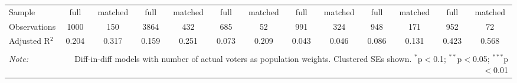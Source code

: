 \begin{table}[!htbp]
\begin{tabular}{@{\extracolsep{5pt}}lcccccccccccc}
Sample & full & matched & full & matched & full & matched & full & matched & full & matched & full & matched \\ 
Observations & 1000 & 150 & 3864 & 432 & 685 & 52 & 991 & 324 & 948 & 171 & 952 & 72 \\ 
Adjusted R$^{2}$ & 0.204 & 0.317 & 0.159 & 0.251 & 0.073 & 0.209 & 0.043 & 0.046 & 0.086 & 0.131 & 0.423 & 0.568 \\ 
\hline 
\hline \\[-1.8ex] 
\textit{Note:}  & \multicolumn{12}{r}{Diff-in-diff models with number of actual voters as population weights. Clustered SEs shown. $^{*}$p$<$0.1; $^{**}$p$<$0.05; $^{***}$p$<$0.01} \\ 
\end{tabular} 
\end{table} 
